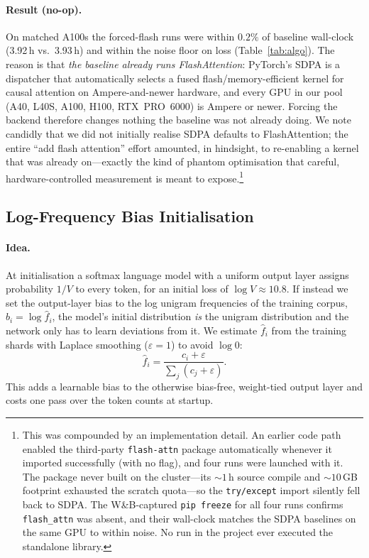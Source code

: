 \documentclass[11pt]{article}
\begin{document}
\paragraph{Result (no-op).} On matched A100s the forced-flash runs were within
$0.2\%$ of baseline wall-clock (3.92\,h vs.\ 3.93\,h) and within the noise floor
on loss (Table~\ref{tab:algo}). The reason is that \emph{the baseline already
runs FlashAttention}: PyTorch's SDPA is a dispatcher that automatically selects a
fused flash/memory-efficient kernel for causal attention on Ampere-and-newer
hardware, and every GPU in our pool (A40, L40S, A100, H100, RTX~PRO~6000) is
Ampere or newer. Forcing the backend therefore changes nothing the baseline was
not already doing. We note candidly that we did not initially realise SDPA
defaults to FlashAttention; the entire ``add flash attention'' effort amounted, in
hindsight, to re-enabling a kernel that was already on---exactly the kind of
phantom optimisation that careful, hardware-controlled measurement is meant to
expose.\footnote{This was compounded by an implementation detail. An earlier code
path enabled the third-party \texttt{flash-attn} package automatically whenever it
imported successfully (with no flag), and four runs were launched with it. The
package never built on the cluster---its ${\sim}1$\,h source compile and
${\sim}10$\,GB footprint exhausted the scratch quota---so the \texttt{try/except}
import silently fell back to SDPA. The W\&B-captured \texttt{pip freeze} for all
four runs confirms \texttt{flash\_attn} was absent, and their wall-clock matches
the SDPA baselines on the same GPU to within noise. No run in the project ever
executed the standalone library.}

\subsection{Log-Frequency Bias Initialisation}

\paragraph{Idea.} At initialisation a softmax language model with a uniform output
layer assigns probability $1/V$ to every token, for an initial loss of
$\log V \approx 10.8$. If instead we set the output-layer bias to the log unigram
frequencies of the training corpus, $b_i = \log\hat{f}_i$, the model's
initial distribution \emph{is} the unigram distribution and the network only has
to learn deviations from it. We estimate $\hat f_i$ from the training shards with
Laplace smoothing ($\varepsilon{=}1$) to avoid $\log 0$:
\[
\hat f_i = \frac{c_i + \varepsilon}{\sum_j (c_j + \varepsilon)} .
\]
This adds a learnable bias to the otherwise bias-free, weight-tied output layer
and costs one pass over the token counts at startup.
\end{document}
